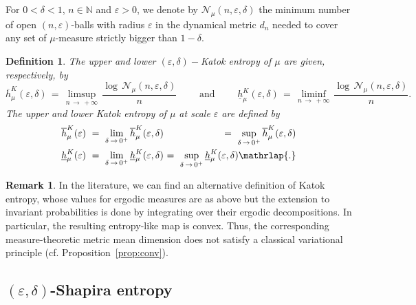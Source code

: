 \documentclass[11pt,a4paper,reqno]{amsart}
\theoremstyle{plain}
\theoremstyle{definition}
\newtheorem{remark}[theorem]{Remark}
\newtheorem{definition}[theorem]{Definition}
\newcommand{\field}[1]{\mathbb{#1}}
\newcommand{\NN}{\field{N}}
\newcommand{\ep} {\varepsilon}
\newcommand{\vep}{\varepsilon}
\begin{document}
For $0 < \delta < 1$, $n \in \NN$ and $\vep > 0$, we denote by $\mathcal{N}_\mu(n,\vep, \delta)$ the minimum number of open $(n,\vep)$-balls with radius $\vep$ in the dynamical metric $d_n$  needed to cover any set of $\mu$-measure strictly bigger than $1 - \delta$.

\begin{definition}\label{def:Kerg}
\emph{The \emph{upper} and \emph{lower $(\ep,\delta)-$Katok entropy of $\mu$} are given, respectively, by
\begin{equation}\label{eq:KatokEntropy}
\overline{h}_\mu^K(\vep, \delta) \, = \, \limsup_{n \, \to \, +\infty}\, \frac{\log \, \mathcal{N}_\mu(n,\vep, \delta)}{n} \qquad \text{ and } \qquad \underline{h}_\mu^K(\vep, \delta) \, = \, \liminf_{n \, \to \, +\infty}\, \frac{\log \, \mathcal{N}_\mu(n,\vep, \delta)}{n}.
\end{equation} 
The \emph{upper} and \emph{lower Katok entropy of $\mu$ at scale $\ep$} are defined by 
\begin{equation}
    \begin{alignedat}{3}
        \overline{h}_\mu^K(\vep)\,\,&=\,\,  \lim_{\delta\,\to\,0^+}\overline{h}_\mu^K(\vep,\delta)\,\,&=\,\,  \sup_{\delta\,\to\,0^+}\overline{h}_\mu^K(\vep,\delta)        \\
        \underline{h}_\mu^K(\vep)\,\,&=\,\,  \lim_{\delta\,\to\,0^+}\underline{h}_\mu^K(\vep,\delta)\,\,&=\,\,  \sup_{\delta\,\to\,0^+}\underline{h}_\mu^K(\vep,\delta)\mathrlap{.}
    \end{alignedat}
\end{equation}}
\end{definition}

\begin{remark}
    In the literature, we can find an alternative definition of Katok entropy, whose values for ergodic measures are as above but the extension to invariant probabilities is done by integrating over their ergodic decompositions. In particular, the resulting entropy-like map is convex. Thus, the corresponding measure-theoretic metric mean dimension does not satisfy a classical variational principle (cf. Proposition~\ref{prop:conv}).
\end{remark}



\subsection{$(\ep,\delta)$-Shapira entropy}
\end{document}
